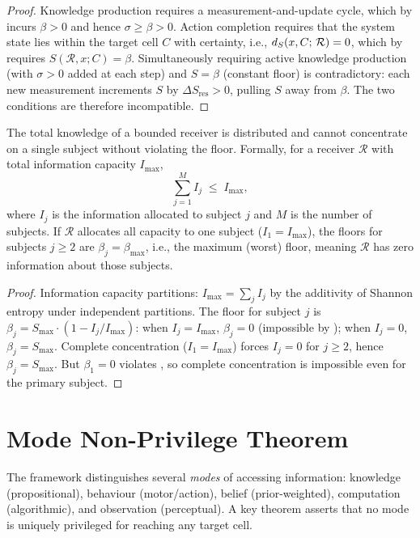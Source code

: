 \begin{proof}
Knowledge production requires a measurement-and-update cycle, which by
 incurs $\beta > 0$ and hence $\sigma \geq \beta > 0$.
Action completion requires that the system state lies within the target cell
$C$ with certainty, i.e., $d_S(x, C;\, \mathcal{R}) = 0$, which by
 requires $S(\mathcal{R}, x; C) = \beta$.
Simultaneously requiring active knowledge production (with $\sigma > 0$ added
at each step) and $S = \beta$ (constant floor) is contradictory: each new
measurement increments $S$ by $\Delta S_{\mathrm{res}} > 0$, pulling $S$ away from
$\beta$.  The two conditions are therefore incompatible.
\end{proof}

\begin{theorem}
\label{thm:distribution}
The total knowledge of a bounded receiver is distributed and cannot
concentrate on a single subject without violating the floor.  Formally, for a
receiver $\mathcal{R}$ with total information capacity $I_{\max}$,
\[
  \sum_{j=1}^M I_j \;\leq\; I_{\max} ,
\]
where $I_j$ is the information allocated to subject $j$ and $M$ is the number
of subjects.  If $\mathcal{R}$ allocates all capacity to one subject
($I_1 = I_{\max}$), the floors for subjects $j \geq 2$ are
$\beta_j = \beta_{\max}$, i.e., the maximum (worst) floor, meaning
$\mathcal{R}$ has zero information about those subjects.
\end{theorem}

\begin{proof}
Information capacity partitions: $I_{\max} = \sum_j I_j$ by the additivity
of Shannon entropy under independent partitions.  The floor for subject $j$ is
$\beta_j = S_{\max} \cdot (1 - I_j/I_{\max})$: when $I_j = I_{\max}$,
$\beta_j = 0$ (impossible by ); when $I_j = 0$,
$\beta_j = S_{\max}$.  Complete concentration ($I_1 = I_{\max}$) forces
$I_j = 0$ for $j \geq 2$, hence $\beta_j = S_{\max}$.  But
$\beta_1 = 0$ violates , so complete concentration
is impossible even for the primary subject.
\end{proof}

\section{Mode Non-Privilege Theorem}
\label{sec:mode-nonprovilege}

The framework distinguishes several \emph{modes} of accessing information:
knowledge (propositional), behaviour (motor/action), belief (prior-weighted),
computation (algorithmic), and observation (perceptual).  A key theorem asserts
that no mode is uniquely privileged for reaching any target cell.

